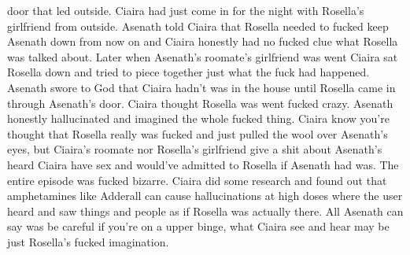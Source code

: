\documentclass[12pt]{book}
\begin{document}
door that led outside. Ciaira had just come in for the night with Rosella's girlfriend from outside. Asenath told Ciaira that Rosella needed to fucked keep Asenath down from now on and Ciaira honestly had no fucked clue what Rosella was talked about. Later when Asenath's roomate's girlfriend was went Ciaira sat Rosella down and tried to piece together just what the fuck had happened. Asenath swore to God that Ciaira hadn't was in the house until Rosella came in through Asenath's door. Ciaira thought Rosella was went fucked crazy. Asenath honestly hallucinated and imagined the whole fucked thing. Ciaira know you're thought that Rosella really was fucked and just pulled the wool over Asenath's eyes, but Ciaira's roomate nor Rosella's girlfriend give a shit about Asenath's heard Ciaira have sex and would've admitted to Rosella if Asenath had was. The entire episode was fucked bizarre. Ciaira did some research and found out that amphetamines like Adderall can cause hallucinations at high doses where the user heard and saw things and people as if Rosella was actually there. All Asenath can say was be careful if you're on a upper binge, what Ciaira see and hear may be just Rosella's fucked imagination.
\end{document}
